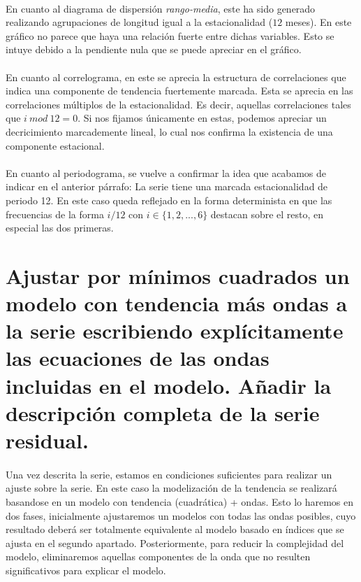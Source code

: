 \documentclass[a4paper, spanish]{article}
\begin{document}
    \paragraph{}
    En cuanto al diagrama de dispersión \emph{rango-media}, este ha sido generado realizando agrupaciones de longitud igual a la estacionalidad ($12$ meses). En este gráfico no parece que haya una relación fuerte entre dichas variables. Esto se intuye debido a la pendiente nula que se puede apreciar en el gráfico.

    \paragraph{}
    En cuanto al correlograma, en este se aprecia la estructura de correlaciones que indica una componente de tendencia fuertemente marcada. Esta se aprecia en las correlaciones múltiplos de la estacionalidad. Es decir, aquellas correlaciones tales que $i \ mod \ 12 = 0$. Si nos fijamos únicamente en estas, podemos apreciar un decricimiento marcademente lineal, lo cual nos confirma la existencia de una componente estacional.

    \paragraph{}
    En cuanto al periodograma, se vuelve a confirmar la idea que acabamos de indicar en el anterior párrafo: La serie tiene una marcada estacionalidad de periodo 12. En este caso queda reflejado en la forma determinista en que las frecuencias de la forma $i/12$ con $i \in \{1, 2, ..., 6\}$ destacan sobre el resto, en especial las dos primeras.

  \section{Ajustar por mínimos cuadrados un modelo con tendencia más ondas a la serie escribiendo explícitamente las ecuaciones de las ondas incluidas en el modelo. Añadir la descripción completa de la serie residual.}

    \paragraph{}
    Una vez descrita la serie, estamos en condiciones suficientes para realizar un ajuste sobre la serie. En este caso la modelización de la tendencia se realizará basandose en un modelo con tendencia (cuadrática) + ondas. Esto lo haremos en dos fases, inicialmente ajustaremos un modelos con todas las ondas posibles, cuyo resultado deberá ser totalmente equivalente al modelo basado en índices que se ajusta en el segundo apartado. Posteriormente, para reducir la complejidad del modelo, eliminaremos aquellas componentes de la onda que no resulten significativos para explicar el modelo.
\end{document}
